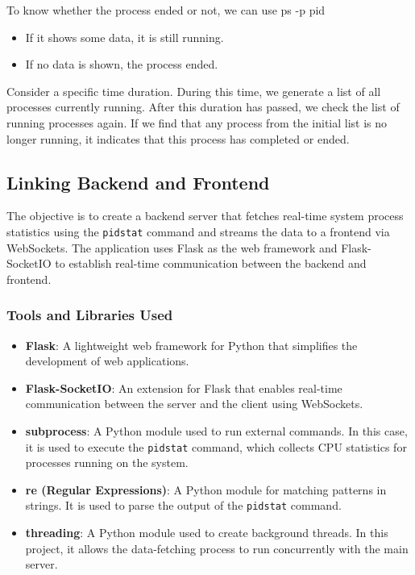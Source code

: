 \documentclass[12pt]{article}
\begin{document}
To know whether the process ended or not, we can use 
ps -p pid
 \begin{itemize}
    \item If it shows some data, it is still running.
    \item If no data is shown, the process ended.
 \end{itemize}
Consider a specific time duration. During this time, we generate a list of all processes currently running. After this duration has passed, we check the list of running processes again. If we find that any process from the initial list is no longer running, it indicates that this process has completed or ended.

\subsection{Linking Backend and Frontend}
The objective is to create a backend server that fetches real-time system process statistics using the \texttt{pidstat} command and streams the data to a frontend via WebSockets. The application uses Flask as the web framework and Flask-SocketIO to establish real-time communication between the backend and frontend.

\subsubsection{Tools and Libraries Used}

\begin{itemize}
    \item \textbf{Flask}: A lightweight web framework for Python that simplifies the development of web applications.
    \item \textbf{Flask-SocketIO}: An extension for Flask that enables real-time communication between the server and the client using WebSockets.
    \item \textbf{subprocess}: A Python module used to run external commands. In this case, it is used to execute the \texttt{pidstat} command, which collects CPU statistics for processes running on the system.
    \item \textbf{re (Regular Expressions)}: A Python module for matching patterns in strings. It is used to parse the output of the \texttt{pidstat} command.
    \item \textbf{threading}: A Python module used to create background threads. In this project, it allows the data-fetching process to run concurrently with the main server.
\end{itemize}
\end{document}
